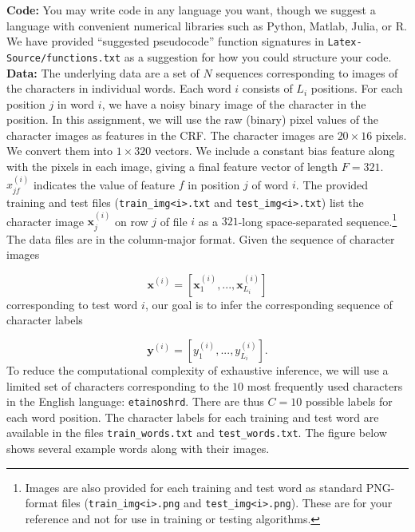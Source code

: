 \documentclass[11pt]{article}
\newcommand{\mbf}[1]{{\mathbf{#1}}} \newcommand{\eq}{\!=\!}
\begin{document}
\textbf{Code: } You may write code in any language you want, though we suggest a language with convenient numerical libraries such as Python, Matlab, Julia, or R.
We have provided ``suggested pseudocode'' function signatures in \texttt{Latex-Source/functions.txt} as a suggestion for how you could structure your code. \\

\textbf{Data: } The underlying data are a set of $N$ sequences corresponding to
images of the characters in individual words. Each word $i$ consists of $L_i$
positions. For each position $j$ in word $i$, we have a noisy binary image of
the character in the position. In this assignment, we will use the raw
(binary) pixel values of the character images as features in the CRF. The
character images are $20\times 16$ pixels. We convert them into $1\times 320$
vectors. We include a constant bias feature along with the pixels in each
image, giving a final feature vector of length $F=321$. $x^{(i)}_{jf}$ indicates the
value of feature $f$ in position $j$ of word $i$. The provided training and
test files (\texttt{train\_img<i>.txt} and \texttt{test\_img<i>.txt}) list the
character image $\mbf{x}^{(i)}_{j}$ on row $j$ of file $i$ as a $321$-long
space-separated sequence.\footnote{Images are also provided for each training and test word as standard PNG-format files (\texttt{train\_img<i>.png} and
\texttt{test\_img<i>.png}). These are for your reference and not for use in
training or testing algorithms.} The data files are in the column-major format.
Given the sequence of character images

\[ \mbf{x}^{(i)}=[\mbf{x}^{(i)}_{1},...,\mbf{x}^{(i)}_{L_i}]\]
corresponding to test word $i$,
our goal is to infer the corresponding sequence of character labels

\[ \mbf{y}^{(i)}=[y^{(i)}_{1},...,y^{(i)}_{L_i}].\]
To reduce the computational complexity of
exhaustive inference, we will use a limited set of characters corresponding to
the $10$ most frequently used characters in the English language:
\texttt{etainoshrd}. There are thus $C=10$ possible labels for each word position.
The character labels for each training and test word are available in the files
\texttt{train\_words.txt} and \texttt{test\_words.txt}. The figure below shows
several example words along with their images.  
\end{document}
